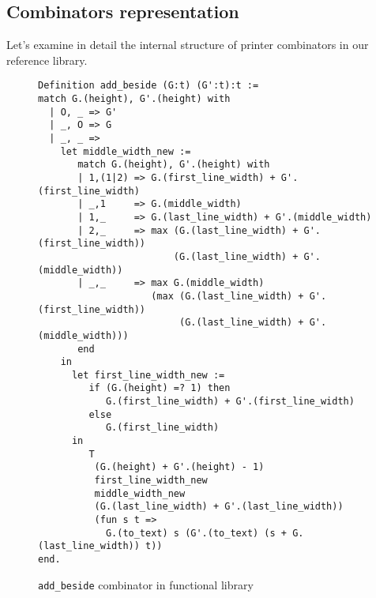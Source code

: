\documentclass[14pt]{constructor-diploma}
\begin{document}
\subsection{Combinators representation}
Let's examine in detail the internal structure of printer combinators in our reference library.
\begin{figure}[H]
\begin{mdframed}[backgroundcolor=bg]
\begin{verbatim}
Definition add_beside (G:t) (G':t):t :=
match G.(height), G'.(height) with
  | O, _ => G'
  | _, O => G
  | _, _ => 
    let middle_width_new :=
       match G.(height), G'.(height) with
       | 1,(1|2) => G.(first_line_width) + G'.(first_line_width)
       | _,1     => G.(middle_width)
       | 1,_     => G.(last_line_width) + G'.(middle_width)
       | 2,_     => max (G.(last_line_width) + G'.(first_line_width))
                        (G.(last_line_width) + G'.(middle_width))
       | _,_     => max G.(middle_width)
                    (max (G.(last_line_width) + G'.(first_line_width))
                         (G.(last_line_width) + G'.(middle_width)))
       end
    in
      let first_line_width_new :=
         if (G.(height) =? 1) then 
            G.(first_line_width) + G'.(first_line_width) 
         else
            G.(first_line_width)
      in
         T
          (G.(height) + G'.(height) - 1)
          first_line_width_new
          middle_width_new 
          (G.(last_line_width) + G'.(last_line_width))
          (fun s t => 
            G.(to_text) s (G'.(to_text) (s + G.(last_line_width)) t))
end.
\end{verbatim}
\end{mdframed}
\caption{\texttt{add\_beside} combinator in functional library}
\label{fig:add_beside_coq}
\end{figure}
\end{document}
